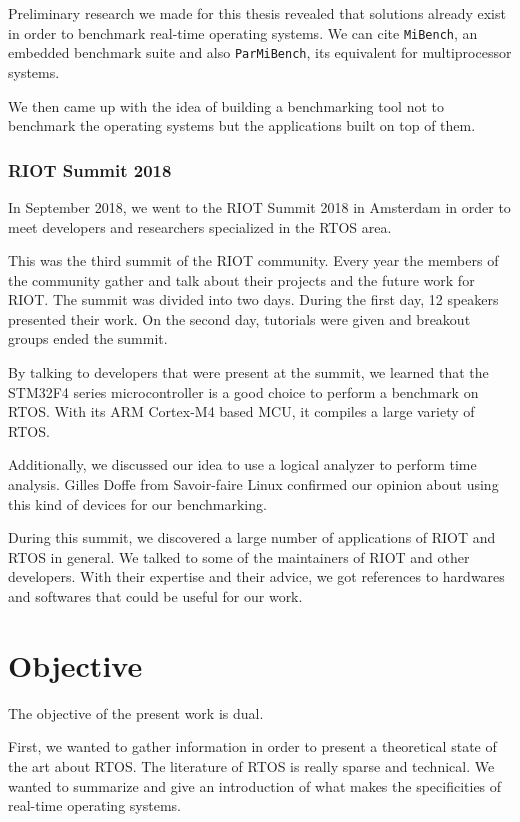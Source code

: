 Preliminary research we made for this thesis revealed that solutions already exist in order to benchmark real-time operating systems.
We can cite \texttt{MiBench}\cite{mibench}, an embedded benchmark suite and also \texttt{ParMiBench}\cite{parmibench}, its equivalent for multiprocessor systems.

We then came up with the idea of building a benchmarking tool not to benchmark the operating systems but the applications built on top of them.

\subsubsection*{RIOT Summit 2018}
In September 2018, we went to the RIOT Summit 2018 in Amsterdam in order to meet developers and researchers specialized in the RTOS area.

This was the third summit of the RIOT community.
Every year the members of the community gather and talk about their projects and the future work for RIOT.
The summit was divided into two days. 
During the first day, 12 speakers presented their work. 
On the second day, tutorials were given and breakout groups ended the summit.

By talking to developers that were present at the summit, we learned that the STM32F4 series microcontroller is a good choice to perform a benchmark on RTOS. 
With its ARM Cortex-M4 based MCU, it compiles a large variety of RTOS.

Additionally, we discussed our idea to use a logical analyzer to perform time analysis. 
Gilles Doffe from Savoir-faire Linux confirmed our opinion about using this kind of devices for our benchmarking.

During this summit, we discovered a large number of applications of RIOT and RTOS in general.
We talked to some of the maintainers of RIOT and other developers. 
With their expertise and their advice, we got references to hardwares and softwares that could be useful for our work.

%
%
\section*{Objective}
The objective of the present work is dual.

First, we wanted to gather information in order to present a theoretical state of the art about RTOS.
The literature of RTOS is really sparse and technical.
We wanted to summarize and give an introduction of what makes the specificities of real-time operating systems.

